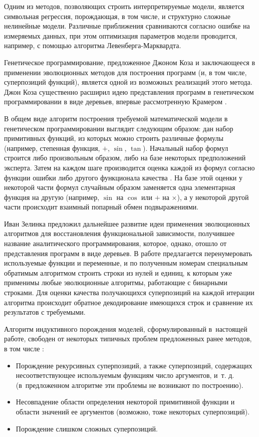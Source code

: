 \documentclass[12pt,a4paper]{article}
\begin{document}
Одним из методов, позволяющих строить интерпретируемые модели, является
символьная регрессия\cite{davidson:2000:snrea,reference/ml/X10vc,StrijovW10,Strijov08InductMethods,Rudoy13},
порождающая, в том числе, и структурно сложные нелинейные модели. Различные
приближения сравниваются согласно ошибке на измеряемых данных, при этом оптимизация
параметров модели проводится, например, с помощью алгоритма Левенберга-Марквардта\cite{Marquardt1963Algorithm,more:78}.

Генетическое программирование, предложенное Джоном Коза и заключающееся в
применении эволюционных методов для построения программ (и, в том числе,
суперпозиций функций), является одной
из возможных реализаций этого метода. Джон Коза
существенно расширил идею представления программ в генетическом
программировании в виде деревьев, впервые рассмотренную Крамером
\cite{Cramer1985}.

В общем виде алгоритм построения требуемой математической модели в
генетическом программировании выглядит следующим образом:
дан набор примитивных функций, из которых можно строить различные формулы
(например, степенная функция, $+$, $\sin$, $\tan$). Начальный набор формул
строится либо произвольным образом, либо на базе некоторых предположений
эксперта. Затем на каждом шаге производится оценка каждой из формул согласно
функции ошибки либо другого функционала качества \cite{Tirsin2005}. На базе
этой оценки у некоторой части формул случайным образом заменяется одна
элементарная функция на другую (например, $\sin$ на $\cos$ или $+$ на
$\times$), а у некоторой другой части происходит взаимный попарный обмен
подвыражениями.

Иван Зелинка предложил дальнейшее развитие идеи применения эволюционных
алгоритмов для восстановления функциональной зависимости, получившее
название аналитического программирования, которое, однако, отошло от
представления программ в виде деревьев. В работе \cite{Zelinka2008}
предлагается перенумеровать используемые функции и переменные, и по
полученным номерам специальным обратимым алгоритмом строить строки из
нулей и единиц, к которым уже применимы любые эволюционные алгоритмы,
работающие с бинарными строками. Для оценки качества получающихся
суперпозиций на каждой итерации алгоритма происходит обратное декодирование
имеющихся строк и сравнение их результатов с требуемыми.

Алгоритм индуктивного порождения моделей, сформулированный в~настоящей работе,
свободен от некоторых типичных проблем предложенных ранее методов, в том числе
\cite{Zelinka2008}:
\begin{itemize}
  \item Порождение рекурсивных суперпозиций, а также суперпозиций, содержащих
	несоответствующее используемым функциям число аргументов, и~т. д.
	(в~предложенном алгоритме эти проблемы не возникают по построению).
  \item Несовпадение области определения некоторой примитивной функции и области
	значений ее аргументов (возможно, тоже некоторых суперпозиций).
  \item Порождение слишком сложных суперпозиций.
\end{itemize}
\end{document}
